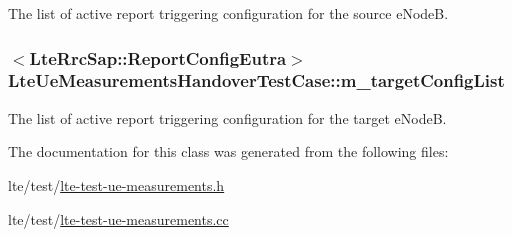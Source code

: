 The list of active report triggering configuration for the source e\+NodeB. 

\subsubsection[{\texorpdfstring{m\+\_\+target\+Config\+List}{m_targetConfigList}}]{$<${\bf Lte\+Rrc\+Sap\+::\+Report\+Config\+Eutra}$>$ Lte\+Ue\+Measurements\+Handover\+Test\+Case\+::m\+\_\+target\+Config\+List\hspace{0.3cm}{\ttfamily [private]}}\hypertarget{classLteUeMeasurementsHandoverTestCase_ab87f6d3138c51c5996947ef91e25a1b8}{}\label{classLteUeMeasurementsHandoverTestCase_ab87f6d3138c51c5996947ef91e25a1b8}


The list of active report triggering configuration for the target e\+NodeB. 



The documentation for this class was generated from the following files\+:\begin{DoxyCompactItemize}
\item 
lte/test/\hyperlink{lte-test-ue-measurements_8h}{lte-\/test-\/ue-\/measurements.\+h}\item 
lte/test/\hyperlink{lte-test-ue-measurements_8cc}{lte-\/test-\/ue-\/measurements.\+cc}\end{DoxyCompactItemize}
